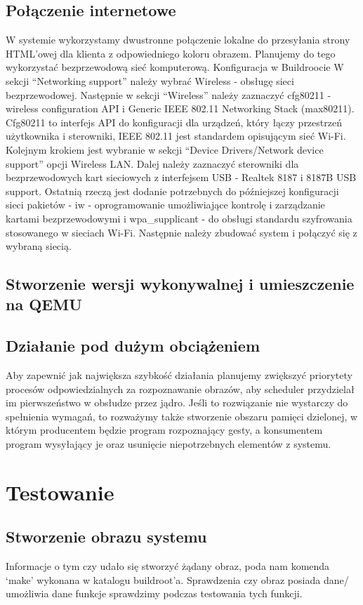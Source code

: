 \documentclass{article}
\begin{document}
\subsection{Połączenie internetowe}
W systemie wykorzystamy dwustronne połączenie lokalne do przesyłania strony HTML’owej dla klienta z odpowiedniego koloru obrazem. Planujemy do tego wykorzystać bezprzewodową sieć komputerową. 
Konfiguracja w Buildroocie
 W sekcji “Networking support” należy wybrać Wireless - obsługę sieci bezprzewodowej. Następnie w sekcji “Wireless” należy zaznaczyć cfg80211 - wireless configuration API  i Generic IEEE 802.11 Networking Stack (max80211). Cfg80211 to interfejs API do konfiguracji dla urządzeń, który łączy przestrzeń użytkownika i sterowniki, IEEE 802.11 jest standardem opisującym sieć Wi-Fi. Kolejnym krokiem jest wybranie w sekcji “Device Drivers/Network device support” opcji Wireless LAN. Dalej należy zaznaczyć sterowniki dla bezprzewodowych kart sieciowych z interfejsem USB - Realtek 8187 i 8187B USB support. Ostatnią rzeczą jest dodanie potrzebnych do późniejszej konfiguracji sieci pakietów - iw - oprogramowanie umożliwiające kontrolę i zarządzanie kartami bezprzewodowymi i wpa\_supplicant - do obsługi standardu szyfrowania stosowanego w sieciach Wi-Fi. Następnie należy zbudować system i połączyć się z wybraną siecią.
\subsection{Stworzenie wersji wykonywalnej i umieszczenie na QEMU}
\subsection{Działanie pod dużym obciążeniem}
Aby zapewnić jak największa szybkość działania planujemy zwiększyć priorytety procesów odpowiedzialnych za rozpoznawanie obrazów, aby scheduler przydzielał im pierwszeństwo w obsłudze przez jądro. Jeśli to rozwiązanie nie wystarczy do spełnienia wymagań, to rozważymy także stworzenie obszaru pamięci dzielonej, w którym producentem będzie program rozpoznający gesty, a konsumentem program wysyłający je oraz usunięcie niepotrzebnych elementów z systemu.
\section{Testowanie}
\subsection{Stworzenie obrazu systemu}
Informacje o tym czy udało się stworzyć żądany obraz, poda nam komenda ‘make’ wykonana w katalogu buildroot’a. Sprawdzenia czy obraz posiada dane/ umożliwia dane funkcje sprawdzimy podczas testowania tych funkcji.
\end{document}
